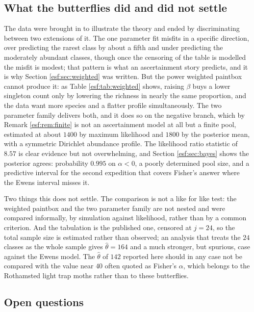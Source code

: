 \subsection{What the butterflies did and did not settle}

The data were brought in to illustrate the theory and ended by discriminating between
two extensions of it. The one parameter fit misfits in a specific direction, over
predicting the rarest class by about a fifth and under predicting the moderately abundant
classes, though once the censoring of the table is modelled the misfit is modest; that pattern is what an ascertainment story predicts, and it is why Section
\ref{esf:sec:weighted} was written. But the power weighted paintbox cannot produce it: as
Table \ref{esf:tab:weighted} shows, raising $\beta$ buys a lower singleton count only by
lowering the richness in nearly the same proportion, and the data want more species and a flatter
profile simultaneously. The two parameter family delivers both, and it does so on the
negative branch, which by Remark \ref{esf:rem:finite} is not an ascertainment model at all
but a finite pool, estimated at about $1400$ by maximum likelihood and $1800$ by the posterior mean, with a symmetric Dirichlet abundance profile.
The likelihood ratio statistic of $8.57$ is clear evidence but not overwhelming, and Section \ref{esf:sec:bayes} shows the posterior agrees: probability $0.995$
on $\alpha < 0$, a poorly determined pool size, and a predictive interval for the second expedition that covers
Fisher's answer where the Ewens interval misses it.

Two things this does not settle. The comparison is not a like for like test: the
weighted paintbox and the two parameter family are not nested and were compared
informally, by simulation against likelihood, rather than by a common criterion. And
the tabulation is the published one, censored at $j = 24$, so the total sample size is estimated rather than observed; an analysis that treats the $24$ classes as the whole sample gives $\hat\theta = 164$ and a much stronger, but spurious, case against the Ewens model. The
$\hat\theta$ of $142$ reported here should in any case not be compared with the value
near $40$ often quoted as Fisher's $\alpha$, which belongs to the Rothamsted light
trap moths rather than to these butterflies.

\subsection{Open questions}

